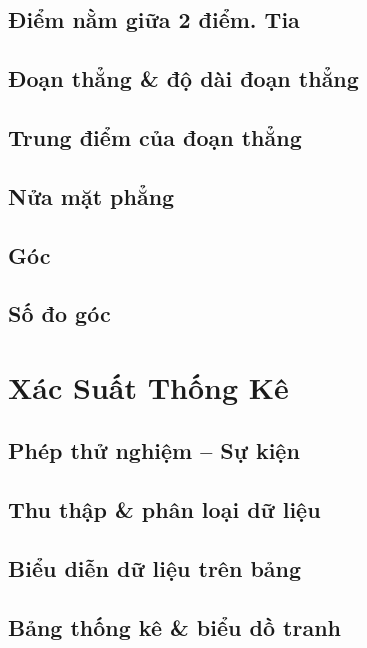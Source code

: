 \documentclass{article}
\numberwithin{equation}{section}
\begin{document}
\subsection{Điểm nằm giữa 2 điểm. Tia}

\subsection{Đoạn thẳng \& độ dài đoạn thẳng}

\subsection{Trung điểm của đoạn thẳng}

\subsection{Nửa mặt phẳng}

\subsection{Góc}

\subsection{Số đo góc}


\section{Xác Suất Thống Kê}

\subsection{Phép thử nghiệm -- Sự kiện}

\subsection{Thu thập \& phân loại dữ liệu}

\subsection{Biểu diễn dữ liệu trên bảng}

\subsection{Bảng thống kê \& biểu dồ tranh}
\end{document}
